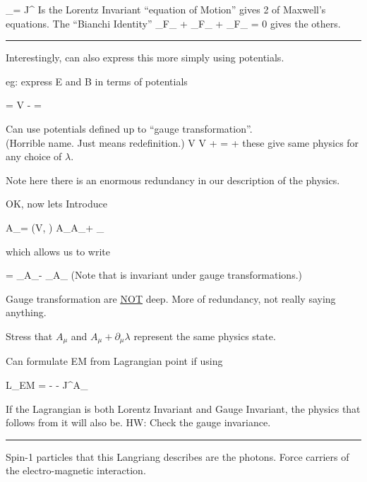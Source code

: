 {\be
\partial_\mu \fMN = J^\nu
\ee
Is the Lorentz Invariant ``equation of Motion'' gives 2 of Maxwell's equations. 
The ``Bianchi Identity'' 
\be
\partial_\mu F_{\nu\rho} + \partial_\rho F_{\mu\nu} + \partial_\nu F_{\rho\mu}  = 0 
\ee
gives the others.

\noindent\rule{\textwidth}{1pt}

Interestingly, can also express this more simply using potentials.

eg: express E and B in terms of potentials

\be
{} = \vec{\nabla}V -  \hspace{1in}   = \vec{\nabla} \times {}
\ee


Can use potentials defined up to ``gauge transformation''.\\
(Horrible name. Just means redefinition.) 
\be
V \rightarrow V +  \hspace{1in}   =  + \vec{\nabla} \lambda
\ee
these give same physics for any choice of $\lambda$.

Note here there is an enormous redundancy in our description of the physics. 

OK, now lets Introduce

\be
A_\mu = (V, ) \hspace{1in} A_\mu \rightarrow A_\mu + \partial_\mu \lambda
\ee

which allows us to write 

\be
\fmn = \partial_\mu A_\nu - \partial_\nu A_\mu
\ee
(Note that \fmn is invariant under gauge transformations.)

Gauge transformation are \underline{\underline{NOT}} deep.  
More of redundancy, not really saying anything. 

Stress that $A_\mu$ and $A_\mu + \partial_\mu \lambda$ represent the same physics state. 

Can formulate EM from Lagrangian point if using 

\be
L_{EM} = - \fmn\fMN - J^\mu A_\mu
\ee

If the Lagrangian is both Lorentz Invariant and Gauge Invariant, the physics that follows from it will also be. 
HW: Check the gauge invariance.

\noindent\rule{\textwidth}{1pt}

Spin-1 particles that this Langriang describes are the photons.  
Force carriers of the electro-magnetic interaction. 

}
